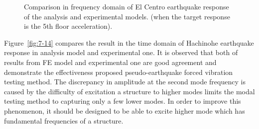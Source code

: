 \begin{figure}[!ht]
{   \label{fig:7-13e}\hfill
}
\caption{Comparison in frequency domain of El Centro earthquake response of the analysis and experimental models. (when the target response is the 5th floor acceleration).}
\label{fig:7-13}
\end{figure}

Figure~\ref{fig:7-14} compares the result in the time domain of Hachinohe earthquake response in analysis model and experimental one. It is observed that both of results from FE model and experimental one are good agreement and demonstrate the effectiveness proposed pseudo-earthquake forced vibration testing method. The discrepancy in amplitude at the second mode frequency is caused by the difficulty of excitation a structure to higher modes limits the modal testing method to capturing only a few lower modes. In order to improve this phenomenon, it should be designed to be able to excite higher mode which has fundamental frequencies of a structure.

